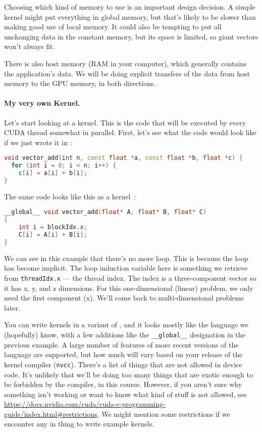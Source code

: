 Choosing which kind of memory to use is an important design decision. A simple kernel might put everything in global memory, but that's likely to be slower than making good use of local memory. It could also be tempting to put all unchanging data in the constant memory, but its space is limited, so giant vectors won't always fit.

There is also host memory (RAM in your computer), which generally contains the application's data. We will be doing explicit transfers of the data from host memory to the GPU memory, in both directions.

\paragraph{My very own Kernel.} Let's start looking at a kernel. This is the code that will be executed by every CUDA thread somewhat in parallel. First, let's see what the code would look like if we just wrote it in \CPP:

\begin{lstlisting}[language=C++]
void vector_add(int n, const float *a, const float *b, float *c) {
  for (int i = 0; i < n; i++) {
    c[i] = a[i] + b[i];
}
\end{lstlisting}


The same code looks like this as a kernel~\cite{cuda}:
\begin{lstlisting}[language=C++]
__global__ void vector_add(float* A, float* B, float* C)
{
    int i = blockIdx.x;
    C[i] = A[i] + B[i];
}
\end{lstlisting}

We can see in this example that there's no more loop. This is because the loop has become implicit. The loop induction variable here is something we retrieve from \texttt{threadIdx.x} --- the thread index. The index is a three-component vector so it has x, y, and z dimensions. For this one-dimensional (linear) problem, we only need the first component (x). We'll come back to multi-dimensional problems later.

You can write kernels in a variant of \CPP, and it looks mostly like the language we (hopefully) know, with a few additions like the \texttt{\_\_global\_\_} designation in the previous example. A large number of features of more recent versions of the language are supported, but how much will vary based on your release of the kernel compiler (\texttt{nvcc}). There's a list of things that are not allowed in device code. It's unlikely that we'll be doing too many things that are exotic enough to be forbidden by the compiler, in this course. However, if you aren't sure why something isn't working or want to know what kind of stuff is not allowed, see \url{https://docs.nvidia.com/cuda/cuda-c-programming-guide/index.html#restrictions}. We might mention some restrictions if we encounter any in thing to write example kernels.

